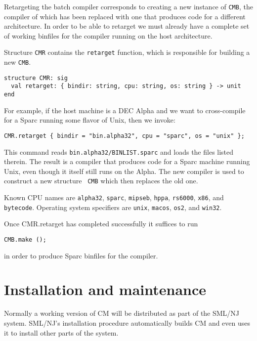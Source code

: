 \documentclass{article}
\begin{document}
Retargeting the batch compiler corresponds to creating a new
instance of {\tt CMB}, the compiler of which has been replaced with
one that produces code for a different architecture.  In order to be
able to retarget we must already have a complete set of working
binfiles for the compiler running on the host architecture.

Structure {\tt CMR} contains the {\tt retarget} function, which is
responsible for building a new {\tt CMB}.

\begin{verbatim}
structure CMR: sig
  val retarget: { bindir: string, cpu: string, os: string } -> unit
end
\end{verbatim}

For example, if the host machine is a DEC Alpha and we want to
cross-compile for a Sparc running some flavor of {\sc Unix}, then we
invoke:

\begin{verbatim}
CMR.retarget { bindir = "bin.alpha32", cpu = "sparc", os = "unix" };
\end{verbatim}

This command reads {\tt bin.alpha32/BINLIST.sparc} and loads the files
listed therein.  The result is a compiler that produces code for a
Sparc machine running {\sc Unix}, even though it itself still runs on the
Alpha.  The new compiler is used to construct a new structure {\tt
CMB} which then replaces the old one.

Known CPU names are {\tt alpha32}, {\tt sparc},
{\tt mipseb}, {\tt hppa}, {\tt rs6000}, {\tt x86}, and {\tt bytecode}.
Operating system specifiers are {\tt unix}, {\tt macos}, {\tt os2},
and {\tt win32}.

Once CMR.retarget has completed successfully it suffices to run

\begin{verbatim}
CMB.make ();
\end{verbatim}

in order to produce Sparc binfiles for the compiler.

\pagebreak

\section{Installation and maintenance}

Normally a working version of CM will be distributed as part of the
SML/NJ system.  SML/NJ's installation procedure automatically builds
CM and even uses it to install other parts of the system.
\end{document}
